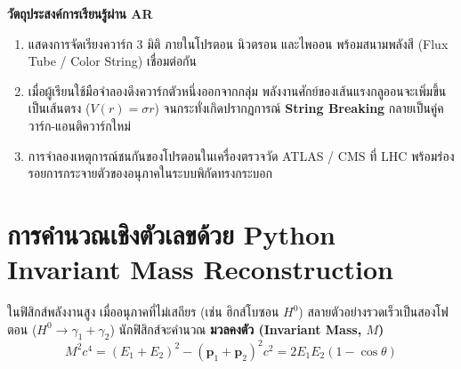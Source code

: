 \begin{arbox}
\textbf{วัตถุประสงค์การเรียนรู้ผ่าน AR}
\begin{enumerate}
    \item แสดงการจัดเรียงควาร์ก 3 มิติ ภายในโปรตอน นิวตรอน และไพออน พร้อมสนามพลังสี (Flux Tube / Color String) เชื่อมต่อกัน
    \item เมื่อผู้เรียนใช้มือจำลองดึงควาร์กตัวหนึ่งออกจากกลุ่ม พลังงานศักย์ของเส้นแรงกลูออนจะเพิ่มขึ้นเป็นเส้นตรง ($V(r) = \sigma r$) จนกระทั่งเกิดปรากฏการณ์ \textbf{String Breaking} กลายเป็นคู่ควาร์ก-แอนติควาร์กใหม่
    \item การจำลองเหตุการณ์ชนกันของโปรตอนในเครื่องตรวจวัด ATLAS / CMS ที่ LHC พร้อมร่องรอยการกระจายตัวของอนุภาคในระบบพิกัดทรงกระบอก
\end{enumerate}
\end{arbox}

\section{การคำนวณเชิงตัวเลขด้วย Python Invariant Mass Reconstruction}

ในฟิสิกส์พลังงานสูง เมื่ออนุภาคที่ไม่เสถียร (เช่น ฮิกส์โบซอน $H^0$) สลายตัวอย่างรวดเร็วเป็นสองโฟตอน ($H^0 \to \gamma_1 + \gamma_2$) นักฟิสิกส์จะคำนวณ \textbf{มวลคงตัว (Invariant Mass, $M$)}
\begin{equation}
M^2 c^4 = (E_1 + E_2)^2 - (\mathbf{p}_1 + \mathbf{p}_2)^2 c^2 = 2 E_1 E_2 (1 - \cos\theta)
\end{equation}

